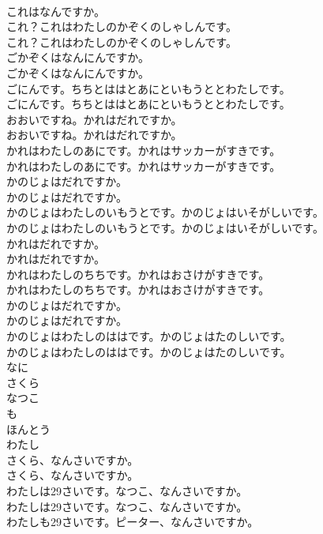 \documentclass[8pt]{extreport}
\begin{document}
\begin{CJK}{UTF8}{min}
\\	これはなんですか。 
\\	これ？これはわたしのかぞくのしゃしんです。	
\\	これ？これはわたしのかぞくのしゃしんです。 
\\	ごかぞくはなんにんですか。	
\\	ごかぞくはなんにんですか。 
\\	ごにんです。ちちとははとあにといもうととわたしです。	
\\	ごにんです。ちちとははとあにといもうととわたしです。 
\\	おおいですね。かれはだれですか。	
\\	おおいですね。かれはだれですか。 
\\	かれはわたしのあにです。かれはサッカーがすきです。	
\\	かれはわたしのあにです。かれはサッカーがすきです。 
\\	かのじょはだれですか。	
\\	かのじょはだれですか。 
\\	かのじょはわたしのいもうとです。かのじょはいそがしいです。	
\\	かのじょはわたしのいもうとです。かのじょはいそがしいです。 
\\	かれはだれですか。	
\\	かれはだれですか。 
\\	かれはわたしのちちです。かれはおさけがすきです。	
\\	かれはわたしのちちです。かれはおさけがすきです。 
\\	かのじょはだれですか。	
\\	かのじょはだれですか。 
\\	かのじょはわたしのははです。かのじょはたのしいです。	
\\	かのじょはわたしのははです。かのじょはたのしいです。 
\\	なに
\\	さくら
\\	なつこ
\\	も
\\	ほんとう
\\	わたし
\\	さくら、なんさいですか。	
\\	さくら、なんさいですか。 
\\	わたしは29さいです。なつこ、なんさいですか。	
\\	わたしは29さいです。なつこ、なんさいですか。 
\\	わたしも29さいです。ピーター、なんさいですか。	

\end{CJK}
\end{document}
